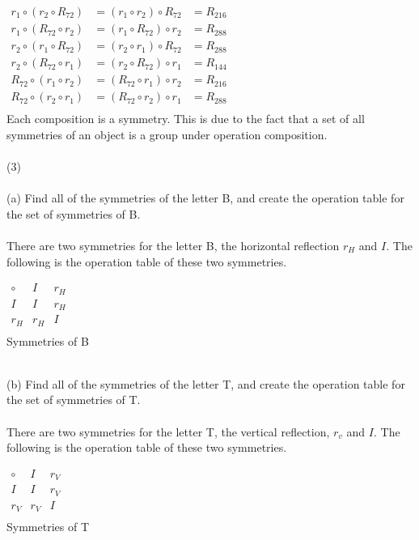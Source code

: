 \documentclass[11pt,a4paper]{article}
\begin{document}
$
\begin{array}{rll}
r_1\circ (r_2\circ R_{72}) &= (r_1\circ r_2)\circ R_{72} &= R_{216}\\
r_1\circ (R_{72}\circ r_2) &= (r_1\circ R_{72})\circ r_2 &= R_{288}\\
r_2\circ (r_1\circ R_{72}) &=  (r_2\circ r_1)\circ R_{72} &= R_{288}\\
r_2\circ (R_{72}\circ r_1) &= (r_2\circ R_{72})\circ r_1 &= R_{144}\\
R_{72}\circ (r_1\circ r_2) &= (R_{72}\circ r_1)\circ r_2 &= R_{216}\\
R_{72}\circ (r_2\circ r_1) &= (R_{72}\circ r_2)\circ r_1 &= R_{288}\\
\end{array}
$
~\\
Each composition is a symmetry. This is due to the fact that a set of all symmetries of an object is a group under operation composition.\\
~\\
(3)\\ 
~\\
(a) Find all of the symmetries of the letter B, and create the operation table
for the set of symmetries of B.\\
~\\
There are two symmetries for the letter B, the horizontal reflection $r_H$ and $I$. The following is the operation table of these two symmetries.\\
\begin{center}
$
\begin{array}{c|c|c}
\circ & I & r_H \\\hline
I & I & r_H \\\hline
r_H & r_H & I \\
\end{array}
$\\
Symmetries of B
\end{center}
~\\
(b) Find all of the symmetries of the letter T, and create the operation table
for the set of symmetries of T.\\
~\\
There are two symmetries for the letter T, the vertical reflection, $r_v$ and $I$. The following is the operation table of these two symmetries.\\
\begin{center}
$
\begin{array}{c|c|c}
\circ & I & r_V \\\hline
I & I & r_V \\\hline
r_V & r_V & I \\
\end{array}
$\\
Symmetries of T
\end{center}
\end{document}
